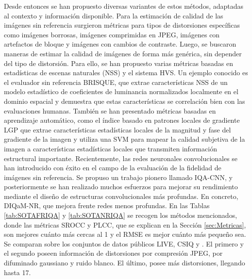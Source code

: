 Desde entonces se han propuesto diversas variantes de estos métodos, adaptadas 
al contexto y información disponible. 
Para la estimación de calidad de las imágenes sin referencia surgieron métricas para 
tipos de distorsiones específicas como 
imágenes borrosas\cite{GradientBasedBlurAssessment}, 
imágenes comprimidas en JPEG\cite{JPEGBasedOnLuminance}, 
imágenes con artefactos de bloque\cite{DeblockedImages} y imágenes con 
cambios de contraste\cite{ContrastDistorted}.
Luego, se buscaron maneras de estimar la calidad de imágenes de forma más genérica, 
sin depender del tipo de distorsión. Para ello, se han propuesto varias métricas 
basadas en estadísticas de escenas naturales (NSS) y el sistema HVS. 
Un ejemplo conocido es el evaluador sin referencia BRISQUE\cite{BRISQUE}, que extrae 
características NSS de un modelo estadístico de coeficientes de luminancia 
normalizados localmente en el dominio espacial y demuestra que estas características 
se correlación bien con las evaluaciones humanas.
También se han presentado métricas basadas en aprendizaje automático, 
como el índice basado en patrones locales de gradiente LGP\cite{LGP} que extrae 
características estadísticas locales de la magnitud y fase del gradiente de la imagen y utiliza una 
SVM para mapear la calidad subjetiva de la imagen a 
características estadísticas locales que transmiten información estructural importante.
Recientemente, las redes neuronales convolucionales se han introducido con 
éxito en el campo de la evaluación de la fidelidad de imágenes sin referencia. 
Se propuso un trabajo pionero llamado IQA-CNN\cite{IQA-CNN}, 
y posteriormente se han realizado muchos esfuerzos para mejorar su rendimiento 
mediante el diseño de estructuras convolucionales más profundas. En concreto,
DIQaM-NR\cite{DIQaM}, que mejora frente redes menos profundas.
En las Tablas \ref{tab:SOTAFRIQA} y \ref{tab:SOTANRIQA} se recogen los 
métodos mencionados, donde las métricas SROCC y PLCC, que se explican 
en la Sección \ref{sec:Metricas}, son mejores cuánto más cercas al 1 y 
el RMSE es mejor cuánto más pequeño sea.  Se comparan sobre los conjuntos de datos públicos
LIVE\cite{LIVE, LIVE1, SSIM}, CSIQ\cite{CSIQ} y \cite{TID2008}. El primero y el segundo poseen información de distorsiones por compresión JPEG, por difuminado gaussiano y ruido blanco. El último, posee más distorsiones, llegando hasta 17.

